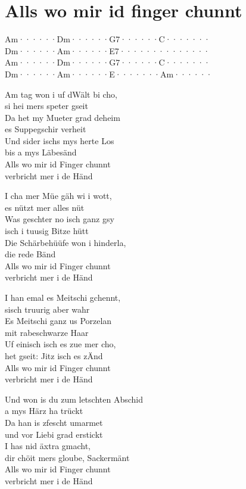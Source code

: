 \documentclass[
  letterpaper,
  twoside=false]{scrbook}
\begin{document}
\hypertarget{alls-wo-mir-id-finger-chunnt}{%
\chapter{Alls wo mir id finger
chunnt}\label{alls-wo-mir-id-finger-chunnt}}

\textbar Am······\textbar Dm······\textbar G7······\textbar C·······\textbar{}\\
\textbar Dm······\textbar Am······\textbar E7······\textbar········\textbar{}\\
\textbar Am······\textbar Dm······\textbar G7······\textbar C·······\textbar{}\\
\textbar Dm······\textbar Am······\textbar E·······\textbar Am······\textbar{}

Am tag won i uf d\textquotesingle Wält bi cho,\\
si hei mers speter gseit\\
Da het my Mueter grad deheim\\
es Suppegschir verheit\\
Und sider ischs mys herte Los\\
bis a mys Läbesänd\\
Alls wo mir id Finger chunnt\\
verbricht mer i de Händ

I cha mer Müe gäh wi i wott,\\
es nützt mer alles nüt\\
Was geschter no isch ganz gsy\\
isch i tuusig Bitze hütt\\
Die Schärbehüüfe won i hinderla,\\
die rede Bänd\\
Alls wo mir id Finger chunnt\\
verbricht mer i de Händ

I han emal es Meitschi gchennt,\\
s\textquotesingle isch truurig aber wahr\\
Es Meitschi ganz us Porzelan\\
mit rabeschwarze Haar\\
Uf einisch isch es zue mer cho,\\
het gseit: Jitz isch es z\textquotesingle Änd\\
Alls wo mir id Finger chunnt\\
verbricht mer i de Händ

Und won i\textquotesingle s du zum letschten Abschid\\
a mys Härz ha trückt\\
Da han i\textquotesingle s z\textquotesingle fescht umarmet\\
und vor Liebi grad erstickt\\
I has nid äxtra gmacht,\\
dir chöit mers gloube, Sackermänt\\
Alls wo mir id Finger chunnt\\
verbricht mer i de Händ
\end{document}
